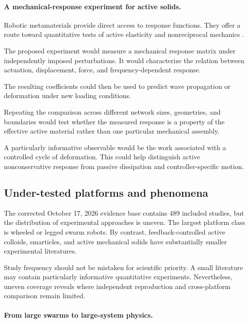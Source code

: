 \paragraph*{A mechanical-response experiment for active solids.}

Robotic metamaterials provide direct
access to response functions.
They offer a route toward
quantitative tests of
active elasticity and
nonreciprocal mechanics
\cite{Brandenbourger2019nonreciprocalrobot,Brandenbourger2021limitcyclesturnac,Binysh2026moreislessinunpe,Coulais2025activemetamaterials}.

The proposed experiment would measure
a mechanical response matrix under
independently imposed perturbations.
It would characterize the relation
between actuation, displacement,
force, and frequency-dependent
response.

The resulting coefficients could
then be used to predict wave
propagation or deformation
under new loading conditions.

Repeating the comparison across
different network sizes,
geometries, and boundaries
would test whether the measured
response is a property of
the effective active material
rather than one particular
mechanical assembly.

A particularly informative
observable would be the work
associated with a controlled
cycle of deformation.
This could help distinguish
active nonconservative response
from passive dissipation
and controller-specific
motion.

\subsection{Under-tested platforms and phenomena}
\label{sec:outlook-gaps}

The corrected October 17, 2026 evidence base
contains 489 included studies, but the
distribution of experimental approaches
is uneven. The largest platform class
is wheeled or legged swarm robots.
By contrast, feedback-controlled
active colloids, smarticles,
and active mechanical solids
have substantially smaller
experimental literatures.

Study frequency should not be mistaken
for scientific priority. A small
literature may contain particularly
informative quantitative experiments.
Nevertheless, uneven coverage reveals
where independent reproduction and
cross-platform comparison remain limited.

\paragraph*{From large swarms to large-system physics.}

